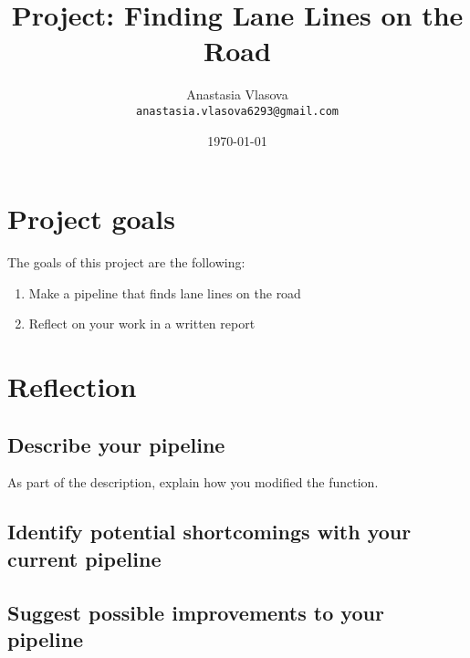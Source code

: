 \documentclass{article}
\title{Project: Finding Lane Lines on the Road}
\author{Anastasia Vlasova\\ \texttt{anastasia.vlasova6293@gmail.com}}
\date{\today}
\begin{document}
\maketitle %


\section{Project goals}

The goals of this project are the following:
\begin{enumerate}
\item Make a pipeline that finds lane lines on the road
\item Reflect on your work in a written report
\end{enumerate}


\section{Reflection}
\subsection{Describe your pipeline}

As part of the description, explain how you modified the  function.

\subsection{Identify potential shortcomings with your current pipeline}

\subsection{Suggest possible improvements to your pipeline}
\end{document}
